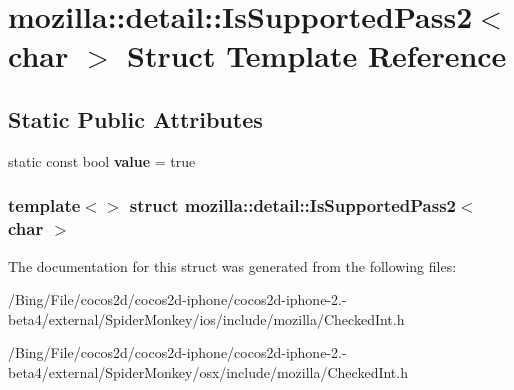 \hypertarget{structmozilla_1_1detail_1_1_is_supported_pass2_3_01char_01_4}{\section{mozilla\-:\-:detail\-:\-:Is\-Supported\-Pass2$<$ char $>$ Struct Template Reference}
\label{structmozilla_1_1detail_1_1_is_supported_pass2_3_01char_01_4}
}
\subsection*{Static Public Attributes}
\begin{DoxyCompactItemize}
\item 
\hypertarget{structmozilla_1_1detail_1_1_is_supported_pass2_3_01char_01_4_a303d2a707faa404517657d2a78060fbf}{static const bool {\bfseries value} = true}\label{structmozilla_1_1detail_1_1_is_supported_pass2_3_01char_01_4_a303d2a707faa404517657d2a78060fbf}

\end{DoxyCompactItemize}
\subsubsection*{template$<$$>$ struct mozilla\-::detail\-::\-Is\-Supported\-Pass2$<$ char $>$}



The documentation for this struct was generated from the following files\-:\begin{DoxyCompactItemize}
\item 
/\-Bing/\-File/cocos2d/cocos2d-\/iphone/cocos2d-\/iphone-\/2.-\/beta4/external/\-Spider\-Monkey/ios/include/mozilla/Checked\-Int.\-h\item 
/\-Bing/\-File/cocos2d/cocos2d-\/iphone/cocos2d-\/iphone-\/2.-\/beta4/external/\-Spider\-Monkey/osx/include/mozilla/Checked\-Int.\-h\end{DoxyCompactItemize}
